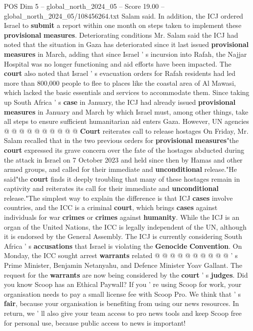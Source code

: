 \begin{textsample}{POS Dim 5 – global\_north\_2024\_05 – Score 19.00 – global\_north\_2024\_05/108456264.txt}
Salam said.
In addition, the ICJ ordered Israel to \textbf{submit} a report within one month on steps taken to implement these \textbf{provisional} \textbf{measures}.
Deteriorating conditions Mr.
Salam said the ICJ had noted that the situation in Gaza has deteriorated since it last issued \textbf{provisional} \textbf{measures} in March, adding that since Israel ' s incursion into Rafah, the Najjar Hospital was no longer functioning and aid efforts have been impacted.
The \textbf{court} also noted that Israel ' s evacuation orders for Rafah residents had led more than 800,000 people to flee to places like the coastal area of Al Mawasi, which lacked the basic essentials and services to accommodate them.
Since taking up South Africa ' s \textbf{case} in January, the ICJ had already issued \textbf{provisional} \textbf{measures} in January and March by which Israel must, among other things, take all steps to ensure sufficient humanitarian aid enters Gaza.
However, UN agencies @ @ @ @ @ @ @ @ @ @ \textbf{Court} reiterates call to release hostages On Friday, Mr.
Salam recalled that in the two previous orders for \textbf{provisional} \textbf{measures}"the \textbf{court} expressed its grave concern over the fate of the hostages abducted during the attack in Israel on 7 October 2023 and held since then by Hamas and other armed groups, and called for their immediate and \textbf{unconditional} release."He said"the \textbf{court} finds it deeply troubling that many of these hostages remain in captivity and reiterates its call for their immediate and \textbf{unconditional} release."The simplest way to explain the difference is that ICJ \textbf{cases} involve countries, and the ICC is a criminal \textbf{court}, which brings \textbf{cases} against individuals for war \textbf{crimes} or \textbf{crimes} against \textbf{humanity}.
While the ICJ is an organ of the United Nations, the ICC is legally independent of the UN, although it is endorsed by the General Assembly.
The ICJ is currently considering South Africa ' s \textbf{accusations} that Israel is violating the \textbf{Genocide} \textbf{Convention}.
On Monday, the ICC sought arrest \textbf{warrants} related @ @ @ @ @ @ @ @ @ @ ' s Prime Minister, Benjamin Netanyahu, and Defence Minister Yoav Gallant.
The request for the \textbf{warrants} are now being considered by the \textbf{court} ' s \textbf{judges}.
Did you know Scoop has an Ethical Paywall?
If you ' re using Scoop for work, your organisation needs to pay a small license fee with Scoop Pro.
We think that ' s \textbf{fair}, because your organisation is benefiting from using our news resources.
In return, we ' ll also give your team access to pro news tools and keep Scoop free for personal use, because public access to news is important!

\end{textsample}
